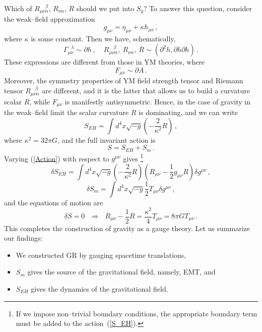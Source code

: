 \documentclass[11pt,a4paper]{article}
\begin{document}
Which of $R_{\mu\nu\alpha}^{~~~~~\beta}$, $R_{\nu\alpha}$, $R$ should we put into $S_g$? To answer this question, consider the weak--field approximation
\begin{equation}
g_{\mu\nu}=\eta_{\mu\nu}+\kappa h_{\mu\nu} \,,
\end{equation}
where $\kappa$ is some constant. Then we have, schematically,
\begin{equation}
\Gamma_{\mu\nu}^{~~~\lambda}\sim\partial h \,,~~~~~R_{\mu\nu\alpha}^{~~~~\beta}, ~R_{\nu\alpha},~R\sim (\partial^2 h, \partial h\partial h) \,.
\end{equation}
These expressions are different from those in YM theories, where
\begin{equation}
F_{\mu\nu}\sim\partial A \,.
\end{equation}
Moreover, the symmetry properties of YM field strength tensor and Riemann tensor $R_{\mu\nu\alpha}^{~~~~\beta}$ are different, and it is the latter that allows us to build a curvature scalar $R$, while $F_{\mu\nu}$ is manifestly antisymmetric. Hence, in the case of gravity in the weak--field limit the scalar curvature $R$ is dominating, and we can write
\begin{equation}\label{S_EH}
S_{EH}=\int d^4x\sqrt{-g}\left(-\dfrac{2}{\kappa^2}R\right) \,,
\end{equation}
where $\kappa^2=32\pi G$, and the full invariant action is
\begin{equation}\label{Action}
S=S_{EH}+S_m \,.
\end{equation}
Varying (\ref{Action}) with respect to $g^{\mu\nu}$ gives \footnote{If we impose non--trivial boundary conditions, the appropriate boundary term must be added to the action~(\ref{S_EH}).}
\begin{equation}
\delta S_{EH}=\int d^4x\sqrt{-g}\left(-\dfrac{2}{\kappa^2}R\right)\left(R_{\mu\nu}-\dfrac{1}{2}g_{\mu\nu}R\right)\delta g^{\mu\nu} \,,
\end{equation}
\begin{equation}
\delta S_m=\int d^4x\sqrt{-g}\dfrac{1}{2}T_{\mu\nu}\delta g^{\mu\nu} \,,
\end{equation}
and the equations of motion are
\begin{equation}
\delta S=0~~~\Rightarrow~~~ R_{\mu\nu}-\dfrac{1}{2}R=\dfrac{\kappa^2}{4}T_{\mu\nu}=8\pi GT_{\mu\nu} \,.
\end{equation}
This completes the construction of gravity as a gauge theory. Let us summarize our findings:
\begin{itemize}
\item We constructed GR by gauging spacetime translations,
\item $S_m$ gives the source of the gravitational field, namely, EMT, and
\item $S_{EH}$ gives the dynamics of the gravitational field.
\end{itemize}
\end{document}
